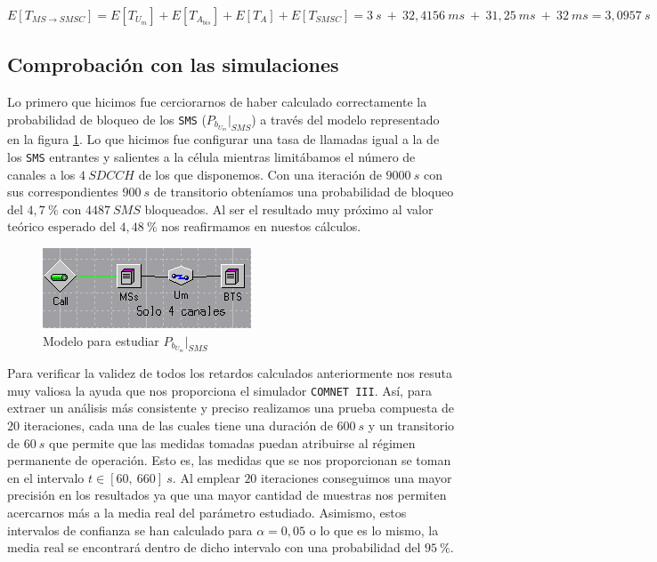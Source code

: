 \documentclass[10pt]{article}
\begin{document}
			$$E[T_{MS \rightarrow SMSC}] = E[T_{U_m}] + E[T_{A_{bis}}] + E[T_A] + E[T_{SMSC}] = 3\ s\ +\ 32,4156\ ms\ +\ 31,25\ ms\ +\ 32\ ms = 3,0957\ s$$

		\subsection{Comprobación con las simulaciones}
			Lo primero que hicimos fue cerciorarnos de haber calculado correctamente la probabilidad de bloqueo de los \texttt{SMS} ($P_{b_{U_m}}\bigr\rvert_{SMS}$) a través del modelo representado en la figura \ref{f:sms_pb}. Lo que hicimos fue configurar una tasa de llamadas igual a la de los \texttt{SMS} entrantes y salientes a la célula mientras limitábamos el número de canales a los $4\ SDCCH$ de los que disponemos. Con una iteración de $9000\ s$ con sus correspondientes $900\ s$ de transitorio obteníamos una probabilidad de bloqueo del $4,7\ \%$ con $4487\ SMS$ bloqueados. Al ser el resultado muy próximo al valor teórico esperado del $4,48\ \%$ nos reafirmamos en nuestos cálculos.

			\begin{figure}
					\centering
					\includegraphics[width=0.3\linewidth]{sms_pb.png}
					\caption{Modelo para estudiar $P_{b_{U_m}}\bigr\rvert_{SMS}$}
					\label{f:sms_pb}
			\end{figure}

			Para verificar la validez de todos los retardos calculados anteriormente nos resuta muy valiosa la ayuda que nos proporciona el simulador \texttt{COMNET III}. Así, para extraer un análisis más consistente y preciso realizamos una prueba compuesta de $20$ iteraciones, cada una de las cuales tiene una duración de $600\ s$ y un transitorio de $60\ s$ que permite que las medidas tomadas puedan atribuirse al régimen permanente de operación. Esto es, las medidas que se nos proporcionan se toman en el intervalo $t \in [60,\ 660]\ s$. Al emplear $20$ iteraciones conseguimos una mayor precisión en los resultados ya que una mayor cantidad de muestras nos permiten acercarnos más a la media real del parámetro estudiado. Asimismo, estos intervalos de confianza se han calculado para $\alpha = 0,05$ o lo que es lo mismo, la media real se encontrará dentro de dicho intervalo con una probabilidad del $95\ \%$.
\end{document}
